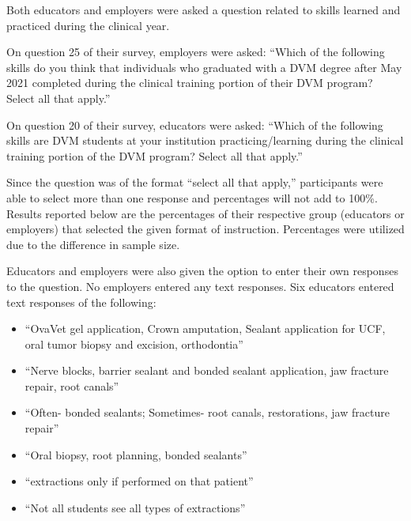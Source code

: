 \documentclass[
  11pt,
  letterpaper,
  DIV=11,
  numbers=noendperiod]{scrartcl}
\providecommand{\tightlist}{%
  \setlength{\itemsep}{0pt}\setlength{\parskip}{0pt}}\usepackage{longtable,booktabs,array}
\numberwithin{figure}{section}
\begin{document}
Both educators and employers were asked a question related to skills
learned and practiced during the clinical year.

On question 25 of their survey, employers were asked: ``Which of the
following skills do you think that individuals who graduated with a DVM
degree after May 2021 completed during the clinical training portion of
their DVM program? Select all that apply.''

On question 20 of their survey, educators were asked: ``Which of the
following skills are DVM students at your institution
practicing/learning during the clinical training portion of the DVM
program? Select all that apply.''

Since the question was of the format ``select all that apply,''
participants were able to select more than one response and percentages
will not add to 100\%. Results reported below are the percentages of
their respective group (educators or employers) that selected the given
format of instruction. Percentages were utilized due to the difference
in sample size.

Educators and employers were also given the option to enter their own
responses to the question. No employers entered any text responses. Six
educators entered text responses of the following:

\begin{itemize}
\tightlist
\item
  ``OvaVet gel application, Crown amputation, Sealant application for
  UCF, oral tumor biopsy and excision, orthodontia''
\item
  ``Nerve blocks, barrier sealant and bonded sealant application, jaw
  fracture repair, root canals''
\item
  ``Often- bonded sealants; Sometimes- root canals, restorations, jaw
  fracture repair''
\item
  ``Oral biopsy, root planning, bonded sealants''
\item
  ``extractions only if performed on that patient''
\item
  ``Not all students see all types of extractions''
\end{itemize}
\end{document}
